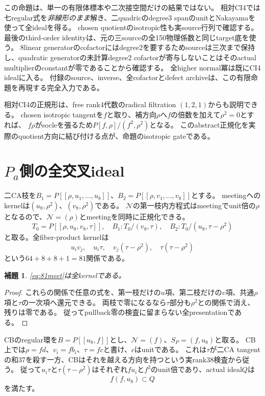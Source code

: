 \documentclass[11pt,a4paper]{ltjsarticle}
\newcommand{\cN}{\mathcal N}
\newtheorem{lemma}[theorem]{補題}
\theoremstyle{definition}
\theoremstyle{remark}
\begin{document}
この命題は、単一の有限体標本や二次接空間だけの結果ではない。
相対CI4では七regular式を\emph{非線形のまま}解き、二quadricのdegree3 spanのunitとNakayamaを使って全idealを得る。
chosen quotientのisotropic性も実source行列で確認する。
最後のthird-order identityは、元の三sourceの全150物理係数と同じtarget底を使う。
8linear generatorのcofactorにはdegree2を要するためsourceは三次まで保持し、quadratic generatorの未計算degree2 cofactorが寄与しないことはそのactual multiplierのconstantが零であることから確認する。
全higher normal冪は既にCI4 idealに入る。
付録のsource、inverse、全cofactorとdefect archiveは、この有限命題を再現する完全入力である。

相対CI4の正規形は、free rank4代数のradical filtration $(1,2,1)$からも説明できる。
chosen isotropic tangentを$f$と取り、補方向$\rho$へ$f$の倍数を加えて$\rho^2=0$とすれば、
$f\rho$がsocleを張るため$P[f,\rho]/(f^2,\rho^2)$となる。
このabstract正規化を実際のquotient方向に結び付ける点が、命題のisotropic gateである。

\section{\texorpdfstring{$P_a$}{Pa}側の全交叉ideal}

二CA枝を$B_1=P[[\rho,u_1,\ldots,u_8]]$、$B_2=P[[\rho,v_1,\ldots,v_8]]$とする。
meetingへのkernelは$(u_8,\rho^2)$、$(v_8,\rho^2)$である。
$\cN$の第一枝内方程式はmeetingでunit倍の$\rho$となるので、$\cN=(\rho)$とmeetingを同時に正規化できる。
\[
 T_0=P[[\rho,u_8,v_8,\tau]],\quad
 B_1:T_0/(v_8,\tau),\quad B_2:T_0/(u_8,\tau-\rho^2)
\]
と取る。全fiber-product kernelは
\begin{equation}\label{eq:81meet}
 u_iv_j,\quad u_i\tau,\quad v_j(\tau-\rho^2),\quad
 \tau(\tau-\rho^2)
\end{equation}
という$64+8+8+1=81$関係である。
\begin{lemma}
\eqref{eq:81meet}は全kernelである。
\end{lemma}
\begin{proof}
これらの関係で任意の式を、第一枝だけの$u$項、第二枝だけの$v$項、共通$\rho$項と$\tau$の一次項へ還元できる。
両枝で零になるなら$\tau$部分も$\rho^2$との関係で消え、残りは零である。
従ってpullback零の検査に留まらない全presentationである。
\end{proof}

CBのregular環を$B=P[[u_8,f]]$とし、$\cN=(f)$、$S_P=(f,u_8)$と取る。
CB上では$\rho=fd$、$v_i=fb_i$、$\tau=fc$と書け、$c$はunitである。
これは$\tau$が二CA tangentの和37を殺す一方、CBはそれを越える方向を持つという実rank38検査から従う。
従って$u_i\tau$と$\tau(\tau-\rho^2)$はそれぞれ$f u_i$と$f^2$のunit倍であり、actual ideal$Q$は
\[
 f(f,u_8)\subset Q
\]
を満たす。
\end{document}
